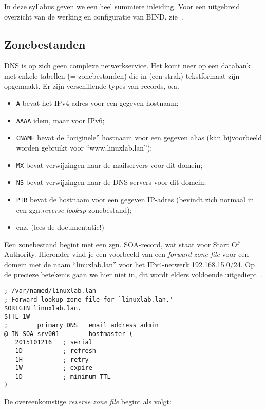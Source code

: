 In deze syllabus geven we een heel summiere inleiding. Voor een uitgebreid overzicht van de werking en configuratie van BIND, zie~\textcite{Aitchison2015}.

\subsection{Zonebestanden}%
\label{ssec:zonebestanden}

DNS is op zich geen complexe netwerkservice. Het komt neer op een databank met enkele tabellen (= zonebestanden) die in (een strak) tekstformaat zijn opgemaakt. Er zijn verschillende types van records, o.a.

\begin{itemize}
\item \texttt{A} bevat het IPv4-adres voor een gegeven hostnaam;
\item \texttt{AAAA} idem, maar voor IPv6;
\item \texttt{CNAME} bevat de ``originele'' hostnaam voor een gegeven alias (kan bijvoorbeeld worden gebruikt voor ``www.linuxlab.lan'');
\item \texttt{MX} bevat verwijzingen naar de mailservers voor dit domein;
\item \texttt{NS} bevat verwijzingen naar de DNS-servers voor dit domein;
\item \texttt{PTR} bevat de hostnaam voor een gegeven IP-adres (bevindt zich normaal in een zgn.\emph{reverse lookup} zonebestand);
\item enz. (lees de documentatie!)
\end{itemize}

Een zonebestand begint met een zgn. SOA-record, wat staat voor Start Of Authority. Hieronder vind je een voorbeeld van een \emph{forward zone file} voor een domein met de naam ``linuxlab.lan'' voor het IPv4-netwerk 192.168.15.0/24. Op de precieze betekenis gaan we hier niet in, dit wordt elders voldoende uitgediept~\autocite{Aitchison2015}.

\begin{verbatim}
; /var/named/linuxlab.lan
; Forward lookup zone file for `linuxlab.lan.'
$ORIGIN linuxlab.lan.
$TTL 1W
;        primary DNS   email address admin
@ IN SOA srv001        hostmaster (
   2015101216   ; serial
   1D           ; refresh
   1H           ; retry
   1W           ; expire
   1D           ; minimum TTL
)
\end{verbatim}

De overeenkomstige \emph{reverse zone file} begint als volgt:

